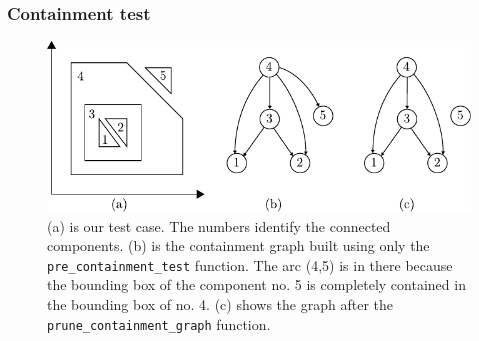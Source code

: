 \subsubsection{Containment test}
\label{sec:conttest_test}

\begin{figure}[h]
    \centering
    \includegraphics{./img/ch2-containmenttest.pdf}
    \caption{(a) is our test case. The numbers identify the connected components. 
        (b) is the containment graph built using only the \texttt{pre\_containment\_test} 
        function. The arc (4,5) is in there because the bounding box of the component 
        no. 5 is completely contained in the bounding box of no. 4. (c) shows 
        the graph after the \texttt{prune\_containment\_graph} function.}
\end{figure}

